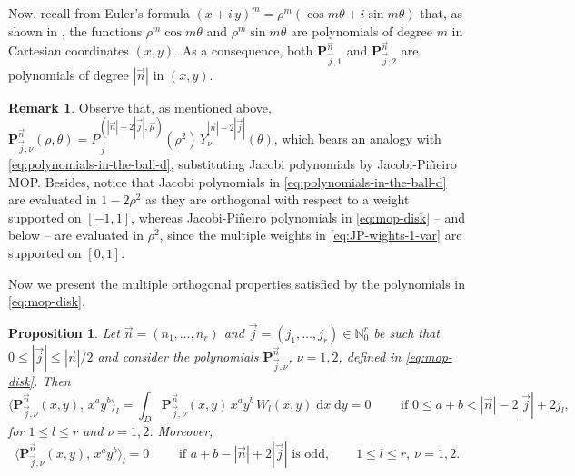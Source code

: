 \documentclass[a4paper]{article}
\theoremstyle{plain}
\newtheorem{proposition}[theorem]{Proposition}
\theoremstyle{definition}
\newtheorem{remark}[theorem]{Remark}
\newcommand{\NN}{\mathbb{N}}
\newcommand{\dxdy}{\;\mathrm{d} x\;\mathrm{d} y}
\begin{document}
    Now, recall from Euler's formula $(x+i\,y)^m=\rho^m(\cos m\theta + i \sin m\theta)$ that, as shown in \cite[Proof of Proposition 2.3.3]{DX14}, the functions $\rho^m \cos m\theta$ and $\rho^m \sin m\theta$ are polynomials of degree $m$ in Cartesian coordinates $(x,y)$. As a consequence, both $\mathbf P_{\vec j,1}^{\vec n}$ and $\mathbf P_{\vec j,2}^{\vec n}$ are polynomials of degree $|\vec n|$ in $(x,y)$. 

    
    \begin{remark}\label{rem:notation-2}
        Observe that, as mentioned above, $\mathbf P_{\vec j,\nu}^{\vec n}(\rho,\theta)=P^{(|\vec n|-2|\vec j|, \vec \mu)}_{\vec j}(\rho^2) \,Y_\nu^{|\vec n|-2|\vec j|}(\theta)$, which bears an analogy with \eqref{eq:polynomials-in-the-ball-d}, substituting Jacobi polynomials by Jacobi-Pi\~neiro MOP. Besides, notice that Jacobi polynomials in \eqref{eq:polynomials-in-the-ball-d} are evaluated in $1-2\rho^2$ as they are orthogonal with respect to a weight supported on $[-1,1]$, whereas Jacobi-Pi\~neiro polynomials in \eqref{eq:mop-disk} -- and below -- are evaluated in $\rho^2$, since the multiple weights in \eqref{eq:JP-wights-1-var} are supported on $[0,1]$. 
    \end{remark}

    

    Now we present the multiple orthogonal properties satisfied by the polynomials in \eqref{eq:mop-disk}.

    \begin{proposition}\label{prop:orthogonality-2-vars}
        Let $\vec n = (n_1,\dots,n_r)$ and $\vec j = (j_1,\dots,j_r)\in\NN_0^r$ be such that  $0\leq |\vec j| \leq |\vec n|/2$ and consider the polynomials $\mathbf P_{\vec j,\nu}^{\vec n}$, $\nu=1,2$, defined in \eqref{eq:mop-disk}. Then
        \begin{equation}
        \label{eq:multiple-orthogonality-disk}
            \langle\mathbf P_{\vec j,\nu}^{\vec n}(x,y),\, x^a y^b\rangle_l=\int_D \mathbf P_{\vec j,\nu}^{\vec n}(x,y)\, x^a y^b \, W_l(x,y)\dxdy =0 \qquad \text{ if }0\leq a+b< |\vec n|-2|\vec j| + 2j_l,
        \end{equation}
        for $1\leq l\leq r$ and $\nu =1,2$. Moreover, 
        $$
        \langle\mathbf P_{\vec j,\nu}^{\vec n}(x,y),\, x^a y^b\rangle_l=0 \qquad\text{ if }a+b - |\vec n|+ 2|\vec j|\text{ is odd}, \qquad 1\leq l\leq r,  \ \nu =1,2.
        $$
    \end{proposition}
    
\end{document}
